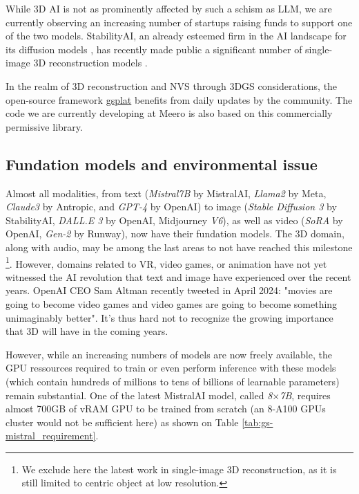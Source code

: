 While 3D \ac{AI} is not as prominently affected by such a schism as \ac{LLM}, we are currently observing an increasing number of startups raising funds to support one of the two models. StabilityAI, an already esteemed firm in the \ac{AI} landscape for its diffusion models \citep{esser2024scaling}, has recently made public a significant number of single-image 3D reconstruction models \citep{tochilkin2024triposr,voleti2024sv3d}. 

In the realm of 3D reconstruction and \ac{NVS} through 3D\ac{GS} considerations, the open-source framework \href{https://docs.gsplat.studio/main/}{gsplat} benefits from daily updates by the community. The code we are currently developing at Meero is also based on this commercially permissive library. 

\subsection{Fundation models and environmental issue}

Almost all modalities, from text (\textit{Mistral7B} by MistralAI, \textit{Llama2} by Meta, \textit{Claude3} by Antropic, and \textit{GPT-4} by OpenAI) to image (\textit{Stable Diffusion 3} by StabilityAI, \textit{DALL.E 3} by OpenAI, Midjourney \textit{V6}), as well as video (\textit{SoRA} by OpenAI, \textit{Gen-2} by Runway), now have their fundation models. The 3D domain, along with audio, may be among the last areas to not have reached this milestone \footnote{We exclude here the latest work in single-image 3D reconstruction, as it is still limited to centric object at low resolution.}. However, domains related to \ac{VR}, video games, or animation have not yet witnessed the \ac{AI} revolution that text and image have experienced over the recent years. OpenAI CEO Sam Altman recently tweeted in April 2024: "movies are going to become video games and video games are going to become something unimaginably better". It's thus hard not to recognize the growing importance that 3D will have in the coming years.

However, while an increasing numbers of models are now freely available, the \ac{GPU} ressources required to train or even perform inference with these models (which contain hundreds of millions to tens of billions of learnable parameters) remain substantial. One of the latest MistralAI model, called \textit{8}$\times$\textit{7B}, requires almost 700GB of vRAM \ac{GPU} to be trained from scratch (an 8-A100 \ac{GPU}s cluster would not be sufficient here) as shown on Table \ref{tab:gs-mistral_requirement}. 

